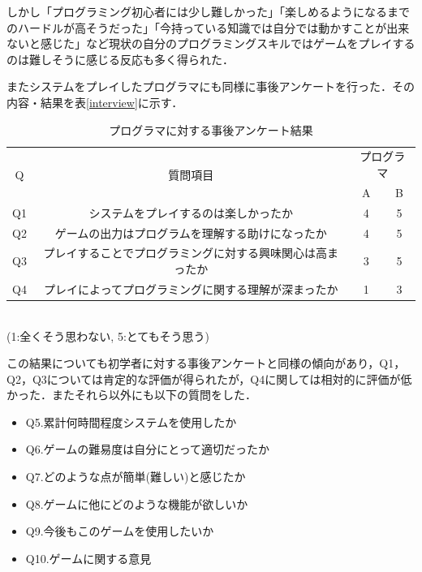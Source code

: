 しかし「プログラミング初心者には少し難しかった」「楽しめるようになるまでのハードルが高そうだった」「今持っている知識では自分では動かすことが出来ないと感じた」など現状の自分のプログラミングスキルではゲームをプレイするのは難しそうに感じる反応も多く得られた．

またシステムをプレイしたプログラマにも同様に事後アンケートを行った．その内容・結果を表\ref{interview}に示す．

\begin{table}[!ht]
  \centering
  \caption{プログラマに対する事後アンケート結果}
  \label{programmer_interview}
    \begin{tabular}{|c|c|c|c|} \hline
      \multirow{2}{*}{Q} & \multirow{2}{*}{質問項目} & \multicolumn{2}{c}{プログラマ} \\ 
        & &A&B\\ \hline\hline
      Q1 & システムをプレイするのは楽しかったか & 4 & 5 \\ \hline
      Q2 & ゲームの出力はプログラムを理解する助けになったか & 4 & 5\\ \hline
      Q3 & プレイすることでプログラミングに対する興味関心は高まったか & 3 & 5\\ \hline
      Q4 & プレイによってプログラミングに関する理解が深まったか & 1 & 3\\ \hline
    \end{tabular}
    \\(1:全くそう思わない, 5:とてもそう思う)
\end{table}
この結果についても初学者に対する事後アンケートと同様の傾向があり，Q1，Q2，Q3については肯定的な評価が得られたが，Q4に関しては相対的に評価が低かった．またそれら以外にも以下の質問をした．

\begin{itemize}
  \item Q5.累計何時間程度システムを使用したか
  \item Q6.ゲームの難易度は自分にとって適切だったか
  \item Q7.どのような点が簡単(難しい)と感じたか
  \item Q8.ゲームに他にどのような機能が欲しいか
  \item Q9.今後もこのゲームを使用したいか
  \item Q10.ゲームに関する意見
\end{itemize}


